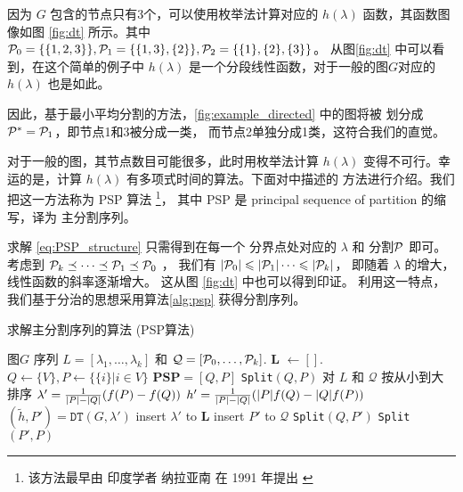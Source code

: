 因为
$G$ 包含的节点只有3个，可以使用枚举法计算对应的 $h(\lambda)$
函数，其函数图像如图 \ref{fig:dt} 所示。其中
$\P_0=\{ \{1,2,3\} \}, \P_1 = \{\{1,3\}, \{2\} \},
\P_2 =\{\{1\},\{2\},\{3\} \}$。
从图\ref{fig:dt} 中可以看到，在这个简单的例子中
$h(\lambda)$
是一个分段线性函数，对于一般的图$G$对应的
$h(\lambda)$ 也是如此。

因此，基于最小平均分割的方法，\ref{fig:example_directed}
中的图将被 划分成 $\P^*=\P_1$，即节点1和3被分成一类，
而节点2单独分成1类，这符合我们的直觉。

对于一般的图，其节点数目可能很多，此时用枚举法计算
$h(\lambda)$ 变得不可行。幸运的是，计算
$h(\lambda)$ 有多项式时间的算法。下面对\cite{mac}中描述的
方法进行介绍。我们把这一方法称为 PSP 算法
\footnote{该方法最早由
印度学者 纳拉亚南 在 1991 年提出 \cite{narayanan}
}，
其中
PSP 是 principal sequence of partition 的缩写，译为
主分割序列。
    
求解 \eqref{eq:PSP_structure} 只需得到在每一个
分界点处对应的 $\lambda$ 和 分割$\P$ 即可。
考虑到 $\P_k \preceq \dots \preceq \P_1 \preceq \P_0$
，
我们有 $|\P_0| \leq |\P_1| \dots \leq |\P_k|$，
即随着 $\lambda $ 的增大，线性函数的斜率逐渐增大。
这从图 \ref{fig:dt} 中也可以得到印证。
利用这一特点，我们基于分治的思想采用算法\ref{alg:psp}
获得分割序列。

\renewcommand{\algorithmicrequire}{\textbf{输入：}\unskip}
\renewcommand{\algorithmicensure}{\textbf{输出：}\unskip}

\begin{algorithm}
  \caption{求解主分割序列的算法 (PSP算法)}
  \label{alg:psp}
  \small
  \begin{algorithmic}[1]
    \REQUIRE 图$G$
    \ENSURE 序列 $L=[\lambda_1, \dots, \lambda_k]$
    和 $\mathcal{Q}=[\P_0, \dots, \P_k]$.
    \STATE \textbf{L}  $\leftarrow []$.
    \STATE $Q\leftarrow \{V\}, P \leftarrow \{ \{i \} | i \in V\}$
    \STATE $\mathbf{PSP}= [Q, P]$
    \STATE \texttt{Split}$(Q,P)$
    \STATE 对 $L$ 和 $\mathcal{Q}$
    按从小到大排序 \footnotemark
     \STATE\label{alg:lambda} $\lambda' =
     {1 \over \abs{P} - \abs{Q}} (f(P)-f(Q))$
     \STATE\label{alg:lambda_plus} $h' = {1 \over \abs{P} - \abs{Q}}(\abs{P} f(Q) - \abs{Q} f(P))$
     \STATE\label{alg:lambda_f} $(\tilde{h}, P') = \texttt{DT}(G,\lambda')$
       \STATE\label{algorithme:terminer} insert $\lambda'$ to $\mathbf{L}$
     \ELSE
       \STATE insert $P'$ to $\mathcal{Q}$
       \STATE\label{algorithme:gauche} \texttt{Split}$(Q, P')$
       \STATE\label{algorithme:droit} \texttt{Split}$(P',P)$
     \ENDIF
    \ENDFUNCTION
  \end{algorithmic}
\end{algorithm}

